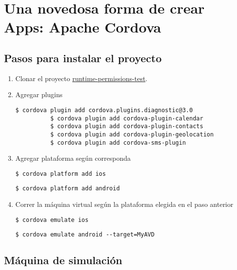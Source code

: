 \chapter{Una novedosa forma de crear Apps: Apache Cordova}
\section{Pasos para instalar el proyecto}
\begin{enumerate}
    \item Clonar el proyecto \href{https://github.com/rgaluppo/runtime_permissions_test}{runtime-permissions-test}.
    \item Agregar plugins
        \begin{lstlisting}[style=BashInputStyle]
          $ cordova plugin add cordova.plugins.diagnostic@3.0
          $ cordova plugin add cordova-plugin-calendar
          $ cordova plugin add cordova-plugin-contacts
          $ cordova plugin add cordova-plugin-geolocation
          $ cordova plugin add cordova-sms-plugin
        \end{lstlisting}
    \item Agregar plataforma seg\'un corresponda
        \begin{lstlisting}[style=BashInputStyle]
          $ cordova platform add ios
        \end{lstlisting}
                \begin{lstlisting}[style=BashInputStyle]
          $ cordova platform add android
        \end{lstlisting}
    \item Correr la m\'aquina virtual seg\'un la plataforma elegida en el paso anterior
        \begin{lstlisting}[style=BashInputStyle]
          $ cordova emulate ios
        \end{lstlisting}
                \begin{lstlisting}[style=BashInputStyle]
          $ cordova emulate android --target=MyAVD
        \end{lstlisting}
\end{enumerate}
\section{M\'aquina de simulaci\'on}
